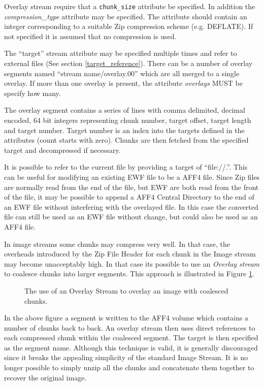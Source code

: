 \documentclass[10pt, conference]{IEEEtran}
\begin{document}
Overlay stream require that a \texttt{chunk\_size} attribute be specified. In
addition the {\em compression\_type} attribute may be specified. The
attribute should contain an integer corresponding to a suitable Zip
compression scheme (e.g. DEFLATE). If not specified it is assumed
that no compression is used.

The ``target'' stream attribute may be specified multiple times and
refer to external files (See section \ref{target_reference}). There
can be a number of overlay segments named ``stream name/overlay.00''
which are all merged to a single overlay. If more than one overlay is
present, the attribute {\em overlays} MUST be specify how many.

The overlay segment contains a series of lines with comma delimited,
decimal encoded, 64 bit integers representing chunk number, target
offset, target length and target number. Target number is an index
into the targets defined in the attributes (count starts with zero).
Chunks are then fetched from the specified target and decompressed if
necessary.

It is possible to refer to the current file by providing a target of
``file://.''. This can be useful for modifying an existing EWF file to
be a AFF4 file. Since Zip files are normally read from the end of the
file, but EWF are both read from the front of the file, it may be
possible to append a AFF4 Central Directory to the end of an EWF file
without interfering with the overlayed file. In this case the
converted file can still be used as an EWF file without change, but
could also be used as an AFF4 file.

In image streams some chunks may compress very well. In that case, the
overheads introduced by the Zip File Header for each chunk in the
Image stream may become unacceptably high. In that case its possible
to use an {\em Overlay stream} to coalesce chunks into larger
segments. This approach is illustrated in Figure \ref{overlay}.

\begin{figure}[tb]
  \begin{center}
  \mbox{\columnwidth {}}
  \caption{The use of an Overlay Stream to overlay an image with
coalesced chunks.}
  \label{overlay}
  \end{center}
\end{figure}

In the above figure a segment is written to the AFF4 volume which
contains a number of chunks back to back. An overlay stream then uses
direct references to each compressed chunk within the coalesced
segment. The target is then specified as the segment name. Although
this technique is valid, it is generally discouraged since it breaks
the appealing simplicity of the standard Image Stream.  It is no
longer possible to simply unzip all the chunks and concatenate them
together to recover the original image.
\end{document}
